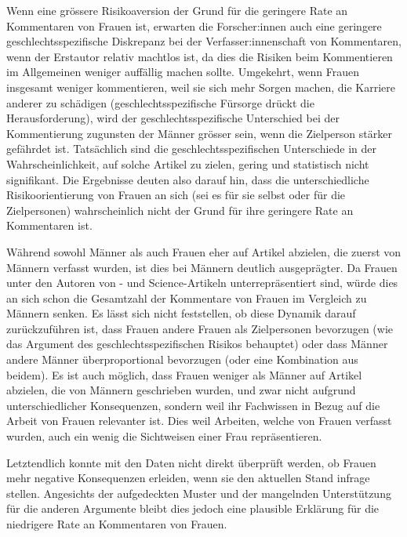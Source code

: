 Wenn eine grössere Risikoaversion der Grund für die geringere Rate an Kommentaren von Frauen ist, 
erwarten die Forscher:innen auch eine geringere geschlechtsspezifische Diskrepanz bei der Verfasser:innenschaft von Kommentaren, 
wenn der Erstautor relativ machtlos ist, da dies die Risiken beim Kommentieren im Allgemeinen weniger auffällig machen sollte. 
Umgekehrt, wenn Frauen insgesamt weniger kommentieren, weil sie sich mehr Sorgen machen, 
die Karriere anderer zu schädigen (geschlechtsspezifische Fürsorge drückt die Herausforderung), 
wird der geschlechtsspezifische Unterschied bei der Kommentierung zugunsten der Männer grösser sein, wenn die Zielperson stärker gefährdet ist. 
Tatsächlich sind die geschlechtsspezifischen Unterschiede in der Wahrscheinlichkeit, auf solche Artikel zu zielen, 
gering und statistisch nicht signifikant. Die Ergebnisse deuten also darauf hin, 
dass die unterschiedliche Risikoorientierung von Frauen an sich (sei es für sie selbst oder für die Zielpersonen) wahrscheinlich 
nicht der Grund für ihre geringere Rate an Kommentaren ist. 

Während sowohl Männer als auch Frauen eher auf Artikel abzielen, die zuerst von Männern verfasst wurden, 
ist dies bei Männern deutlich ausgeprägter. Da Frauen unter den Autoren von - und Science-Artikeln unterrepräsentiert sind, 
würde dies an sich schon die Gesamtzahl der Kommentare von Frauen im Vergleich zu Männern senken.
Es lässt sich nicht feststellen, ob diese Dynamik darauf zurückzuführen ist, 
dass Frauen andere Frauen als Zielpersonen bevorzugen (wie das Argument des geschlechtsspezifischen Risikos behauptet) 
oder dass Männer andere Männer überproportional bevorzugen (oder eine Kombination aus beidem). 
Es ist auch möglich, dass Frauen weniger als Männer auf Artikel abzielen, die von Männern geschrieben wurden, 
und zwar nicht aufgrund unterschiedlicher Konsequenzen, 
sondern weil ihr Fachwissen in Bezug auf die Arbeit von Frauen relevanter ist.
Dies weil Arbeiten, welche von Frauen verfasst wurden, auch ein wenig die Sichtweisen einer Frau repräsentieren.

Letztendlich konnte mit den Daten nicht direkt überprüft werden, ob Frauen mehr negative Konsequenzen erleiden, 
wenn sie den aktuellen Stand infrage stellen. Angesichts der aufgedeckten Muster und der mangelnden Unterstützung 
für die anderen Argumente bleibt dies jedoch eine plausible Erklärung für die niedrigere Rate an Kommentaren von Frauen.

